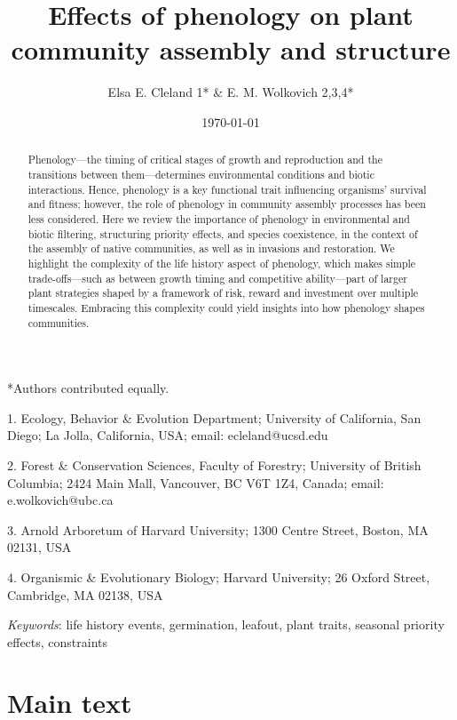 \documentclass[11pt]{article}
\begin{document}
\renewcommand{\refname}{\CHead{}}

\title{Effects of phenology on plant community assembly and structure }
\author{Elsa E. Cleland 1* \& E. M. Wolkovich 2,3,4*}
\date{\today}
\maketitle


\setlength{\parindent}{0cm}
\setlength{\parskip}{5pt}
*Authors contributed equally.

1. Ecology, Behavior & Evolution Department; University of California, San Diego; La Jolla, California, USA; email: ecleland@ucsd.edu

2. Forest & Conservation Sciences, Faculty of Forestry; University of British Columbia; 2424 Main Mall, Vancouver, BC V6T 1Z4, Canada; email: e.wolkovich@ubc.ca

3. Arnold Arboretum of Harvard University; 1300 Centre Street, Boston, MA 02131, USA

4. Organismic & Evolutionary Biology; Harvard University; 26 Oxford Street, Cambridge, MA 02138, USA

\begin{abstract} %
Phenology---the timing of critical stages of growth and reproduction and the transitions between them---determines environmental conditions and biotic interactions. Hence, phenology is a key functional trait influencing organisms' survival and fitness; however, the role of phenology in community assembly processes has been less considered. Here we review the importance of phenology in environmental and biotic filtering, structuring priority effects, and species coexistence, in the context of the assembly of native communities, as well as in invasions and restoration. We highlight the complexity of the life history aspect of phenology, which makes simple trade-offs---such as between growth timing and competitive ability---part of larger plant strategies shaped by a framework of risk, reward and investment over multiple timescales. Embracing this complexity could yield insights into how phenology shapes communities.
\end{abstract}

\emph{Keywords}: life history events, germination, leafout, plant traits, seasonal priority effects, constraints

\section{Main text}
\linenumbers
\end{document}
